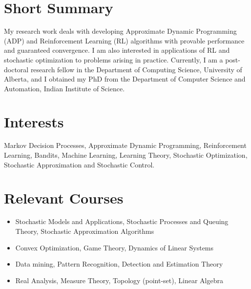 \documentclass[line,margin]{res}
\begin{document}
\address{Mobile: +1(587)-778-2035}
\address{E-mail: chandrurec5@gmail.com}
\begin{resume}
\section{Short Summary} My research work deals with developing Approximate Dynamic Programming (ADP) and Reinforcement Learning (RL) algorithms with provable performance and guaranteed convergence. I am also interested in applications of RL and stochastic optimization to problems arising in practice. Currently, I am a post-doctoral research fellow in the Department of Computing Science, University of Alberta, and I obtained my PhD from the Department of Computer Science and Automation, Indian Institute of Science.
\section{Interests}
Markov Decision Processes, Approximate Dynamic Programming, Reinforcement Learning, Bandits, Machine Learning, Learning Theory, Stochastic Optimization, Stochastic Approximation and Stochastic Control.
\section{Relevant Courses} 
\begin{itemize}
\item Stochastic Models and Applications, Stochastic Processes and Queuing Theory, Stochastic Approximation Algorithms
\item Convex Optimization, Game Theory, Dynamics of Linear Systems
\item Data mining, Pattern Recognition, Detection and Estimation Theory
\item Real Analysis, Measure Theory, Topology (point-set), Linear Algebra
\end{itemize}

\end{resume}
\end{document}
